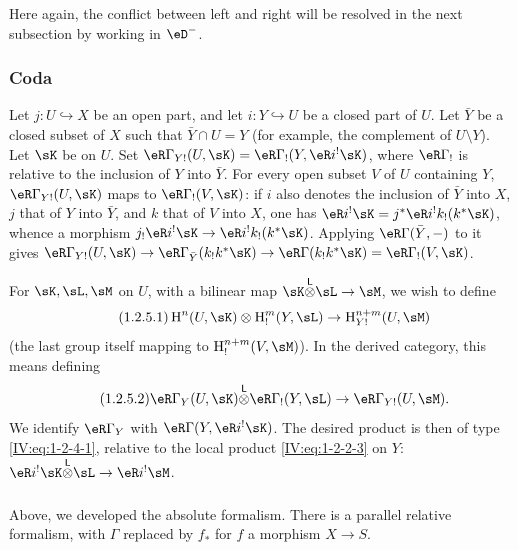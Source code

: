 Here again, the conflict between left and right will be resolved in the next
subsection by working in $\eD^-$.






\subsubsection{Coda}\label{IV:1-2-5}

Let $j:U\hookrightarrow X$ be an open part, and let $i:Y\hookrightarrow U$ be
a closed part of $U$. Let $\bar Y$ be a closed subset of $X$ such that
$\bar Y\cap U=Y$ (for example, the complement of $U\setminus Y$). Let $\sK$
be on $U$. Set $\eR\Gamma_{Y!}(U,\sK)=\eR\Gamma_!(Y,\eR i^!\sK)$, where
$\eR\Gamma_!$ is relative to the inclusion of $Y$ into $\bar Y$. For every
open subset $V$ of $U$ containing $Y$, $\eR\Gamma_{Y!}(U,\sK)$ maps to
$\eR\Gamma_!(V,\sK)$: if $i$ also denotes the inclusion of $\bar Y$ into
$X$, $j$ that of $Y$ into $\bar Y$, and $k$ that of $V$ into $X$, one has
$\eR i^!\sK = j^*\eR i^! k_!(k^*\sK)$, whence a morphism
$j_!\eR i^!\sK \to \eR i^! k_!(k^*\sK)$. Applying
$\eR\Gamma(\bar Y,-)$ to it gives
$\eR\Gamma_{Y!}(U,\sK)\to \eR\Gamma_{\bar Y}(k_! k^* \sK) \to \eR\Gamma(k_! k^*\sK) = \eR\Gamma_!(V,\sK)$.

For $\sK,\sL,\sM$ on $U$, with a bilinear map
$\sK\lotimes\sL\to\sM$, we wish to define
\begin{equation*}\tag{1.2.5.1}\label{IV:eq:1-2-5-1}
  \h^n(U,\sK)\otimes \h_!^m(Y,\sL) \to \h_{Y!}^{n+m}(U,\sM)
\end{equation*}
(the last group itself mapping to $\h_!^{n+m}(V,\sM)$). In the derived
category, this means defining
\begin{equation*}\tag{1.2.5.2}\label{IV:eq:1-2-5-2}
  \eR\Gamma_Y(U,\sK) \lotimes \eR\Gamma_!(Y,\sL) \to \eR\Gamma_{Y!}(U,\sM) \text{.}
\end{equation*}
We identify $\eR\Gamma_Y$ with $\eR\Gamma(Y,\eR i^!\sK)$. The desired
product is then of type \eqref{IV:eq:1-2-4-1}, relative to the local product
\eqref{IV:eq:1-2-2-3} on $Y$:
$\eR i^! \sK\lotimes\sL \to \eR i^! \sM$.






\subsubsection{}\label{IV:1-2-6}

Above, we developed the absolute formalism. There is a parallel relative
formalism, with $\Gamma$ replaced by $f_*$ for $f$ a morphism $X\to S$.










